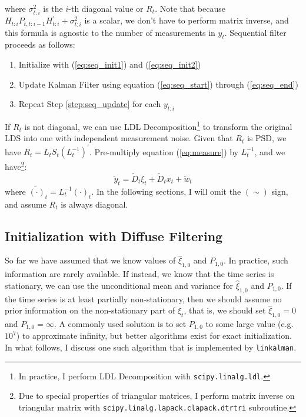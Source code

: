 \documentclass[12pt]{article}
\newenvironment{boenumerate}
    {\begin{enumerate}\renewcommand\labelenumi{\textbf\theenumi}}
    {\end{enumerate}}
\numberwithin{equation}{section}
\begin{document}
where $\sigma_{t:i}^2$ is the $i$-th diagonal value or $R_t$. Note that because $H_{t:i}P_{t,t:i-1}H_{t:i}^{'}+\sigma_{t:i}^{2}$ is a scalar, we don't have to perform matrix inverse, and this formula is agnostic to the number of measurements in $y_t$. Sequential filter proceeds as follows:
\begin{boenumerate}
    \item Initialize with (\ref{eq:seq_init1}) and (\ref{eq:seq_init2})
    \item \label{step:seq_update} Update Kalman Filter using equation (\ref{eq:seq_start}) through (\ref{eq:seq_end})
    \item Repeat Step \ref{step:seq_update} for each $y_{t:i}$
\end{boenumerate}
If $R_t$ is not diagonal, we can use LDL Decomposition\footnote{In practice, I perform LDL Decomposition with \texttt{scipy.linalg.ldl}.} to transform the original LDS into one with independent measurement noise. Given that $R_t$ is PSD, we have $R_t = L_tS_t(L_t^{-1})^{'}$. Pre-multiply equation (\ref{eq:measure}) by $L_t^{-1}$, and we have\footnote{Due to special properties of triangular matrices, I perform matrix inverse on triangular matrix with \texttt{scipy.linalg.lapack.clapack.dtrtri} subroutine.}:
\[
    \tilde{y}_t = \tilde{D}_t\xi_{t} + \tilde{D}_{t}x_t + \tilde{w}_t
\]
where $\tilde{(\cdot)}_t = L_t^{-1}(\cdot)_t$. In the following sections, I will omit the $(\sim)$ sign, and assume $R_t$ is always diagonal.

\subsection{Initialization with Diffuse Filtering}
So far we have assumed that we know values of $\hat{\xi}_{1,0}$ and $P_{1,0}$. In practice, such information are rarely available. If instead, we know that the time series is stationary, we can use the unconditional mean and variance for $\hat{\xi}_{1,0}$ and $P_{1,0}$. If the time series is at least partially non-stationary, then we should assume no prior information on the non-stationary part of $\xi_t$, that is, we should set $\hat{\xi}_{1,0}=0$ and $P_{1,0}=\infty$. A commonly used solution is to set $P_{1,0}$ to some large value (e.g. $10^7$) to approximate infinity, but better algorithms exist for exact initialization. In what follows, I discuss one such algorithm that is implemented by \texttt{linkalman}.
\end{document}
